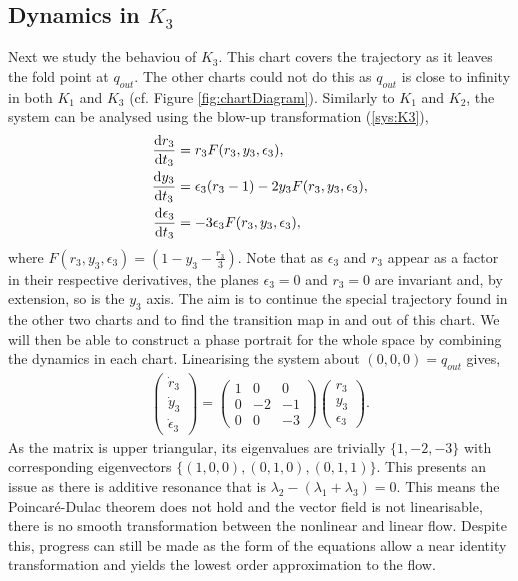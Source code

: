 \subsection{Dynamics in \texorpdfstring{$K_3$}{K3}}\label{sec:dynamics-in-texorpdfstringk3k3}
Next we study the behaviou of $ K_3 $. This chart covers the trajectory as it leaves the fold point at $q_{out}$. The other charts could not do this as $q_{out}$ is close to infinity in both $K_1$ and $K_3$ (cf. Figure \ref{fig:chartDiagram}). Similarly to $K_1$ and $K_2$, the system can be analysed using the blow-up transformation (\ref{sys:K3}),
\begin{subequations}
	\begin{align}
	\od{r_3}{t_3}&=r_3F(r_3,y_3,\epsilon_3), \\
	\od{y_3}{t_3}&=\epsilon_3(r_3-1)-2y_3F(r_3,y_3,\epsilon_3),\\
	\od{\epsilon_3}{t_3}&=-3\epsilon_3F(r_3,y_3,\epsilon_3),
	\end{align}
	\label{sys:K3blowup}
\end{subequations}
where $F(r_3,y_3,\epsilon_3)=\left(1-y_3-\frac{r_3}{3}\right)$. Note that as $\epsilon_3$ and $r_3$ appear as a factor in their respective derivatives, the planes $\epsilon_3=0$ and $r_3=0$ are invariant and, by extension, so is the $y_3$ axis.
The aim is to continue the special trajectory found in the other two charts and to find the transition map in and out of this chart. We will then be able to construct a phase portrait for the whole space by combining the dynamics in each chart. Linearising the system about $(0,0,0)=q_{out}$ gives, 
\begin{align*}
\begin{pmatrix}\dot{r}_3\\\dot{y}_3\\\dot{\epsilon}_3\end{pmatrix}= \begin{pmatrix}
1 & 0 & 0 \\ 
0 & -2 & -1 \\ 
0 & 0 & -3
\end{pmatrix} \begin{pmatrix}
r_3 \\ 
y_3 \\ 
\epsilon_3
\end{pmatrix} .
\end{align*}
As the matrix is upper triangular, its eigenvalues are trivially  $\lbrace 1,-2,-3\rbrace$ with corresponding eigenvectors $\lbrace (1,0,0),(0,1,0),(0,1,1)\rbrace$. This presents an issue as there is additive resonance that is $\lambda_2-(\lambda_1+\lambda_3)=0$.  This means the Poincar\'e-Dulac theorem does not hold and the vector field is not linearisable, there is no smooth transformation between the nonlinear and linear flow. Despite this, progress can still be made as the form of the equations allow a near identity transformation and yields the lowest order approximation to the flow. %
